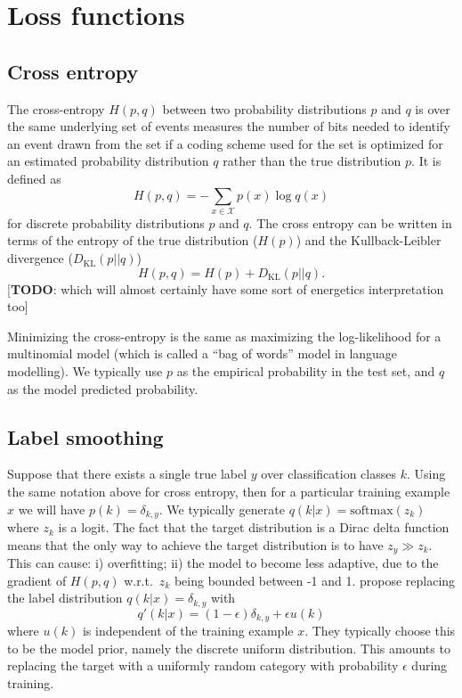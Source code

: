 \documentclass[11pt]{article}
\numberwithin{equation}{section}
\begin{document}
\section{Loss functions}

\subsection{Cross entropy}
The cross-entropy $H(p,q)$ between two probability distributions $p$ and $q$ is over the same underlying set of events measures the number of bits needed to identify an event drawn from the set if a coding scheme used for the set is optimized for an estimated probability distribution $q$ rather than the true distribution $p$. It is defined as 
\begin{equation}
H(p,q) = - \sum_{x \in \mathcal{X}} p(x) \log q(x)
\end{equation}
for discrete probability distributions $p$ and $q$. The cross entropy can be written in terms of the entropy of the true distribution ($H(p)$) and the Kullback-Leibler divergence ($D_{\text{KL}}(p||q)$)
\begin{equation}
H(p,q) = H(p) + D_{\text{KL}}(p||q).
\end{equation}
[\textbf{TODO}: which will almost certainly have some sort of energetics interpretation too] 

Minimizing the cross-entropy is the same as maximizing the log-likelihood for a multinomial model (which is called a ``bag of words'' model in language modelling). We typically use $p$ as the empirical probability in the test set, and $q$ as the model predicted probability.

\subsection{Label smoothing}
Suppose that there exists a single true label $y$ over classification classes $k$. Using the same notation above for cross entropy, then for a particular training example $x$ we will have $p(k)=\delta_{k,y}$. We typically generate $q(k|x)= \text{softmax}(z_k)$ where $z_k$ is a logit. The fact that the target distribution is a Dirac delta function means that the only way to achieve the target distribution is to have $z_y \gg z_k$. This can cause: i) overfitting; ii) the model to become less adaptive, due to the gradient of $H(p,q)$ w.r.t.\ $z_k$ being bounded between -1 and 1. \cite{Szegedy16} propose replacing the label distribution $q(k|x)=\delta_{k,y}$ with
\begin{equation}
q'(k|x) = (1-\epsilon) \delta_{k,y} + \epsilon u(k)
\end{equation}
where $u(k)$ is independent of the training example $x$. They typically choose this to be the model prior, namely the discrete uniform distribution. This amounts to replacing the target with a uniformly random category with probability $\epsilon$ during training. 


\newpage
 
\end{document}
